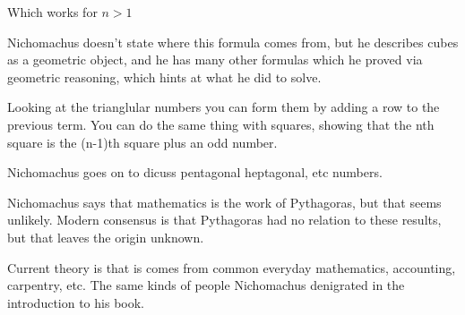 \documentclass{report}
\begin{document}
\begin{description}
\begin{mdframed}
\begin{itemize}
\begin{mdframed}
                        Which works for $n > 1$
                    \end{mdframed}
                    \begin{mdframed}
                        Nichomachus doesn't state where this
                        formula comes from, but he describes
                        cubes as a geometric object, and he
                        has many other formulas which he
                        proved via geometric reasoning,
                        which hints at what he did to solve.
                    \end{mdframed}
                    \begin{mdframed}
                        Looking at the trianglular numbers you
                        can form them by adding a row to the
                        previous term. You can do the same
                        thing with squares, showing that
                        the nth square is the (n-1)th square plus
                        an odd number.
                    \end{mdframed}
                    \begin{mdframed}
                        Nichomachus goes on to dicuss pentagonal
                        heptagonal, etc numbers.
                    \end{mdframed}
                    \begin{mdframed}
                        Nichomachus says that mathematics is the
                        work of Pythagoras, but that seems unlikely.
                        Modern consensus is that Pythagoras had
                        no relation to these results, but that
                        leaves the origin unknown.
                    \end{mdframed}
                    \begin{mdframed}
                        Current theory is that is comes from
                        common everyday mathematics, accounting,
                        carpentry, etc. The same kinds of people
                        Nichomachus denigrated in the introduction to
                        his book.
                    \end{mdframed}
            \end{itemize}
        \end{mdframed}
\end{description}
\end{document}
